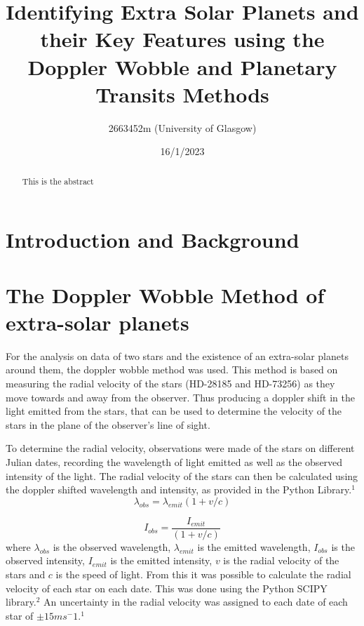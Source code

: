 \documentclass[]{article}
\title{\textbf{Identifying Extra Solar Planets and their Key Features using 
the Doppler Wobble and Planetary Transits Methods}}
\author{2663452m (University of Glasgow)}
\date{16/1/2023}
\begin{document}
\maketitle

\begin{abstract}
This is the abstract

\end{abstract}
\newpage



\twocolumn
\section*{Introduction and Background}

\section*{The Doppler Wobble Method of extra-solar planets}
\par
For the analysis on data of two stars and the existence of an extra-solar planets 
around them, the doppler wobble method was used. This method is based on measuring the 
radial velocity of the stars (HD-28185 and HD-73256) as they move towards and away from 
the observer. Thus
producing a doppler shift in the light emitted from the stars, that can be used to 
determine the velocity of the stars in the plane of the observer's line of sight. 
\par
To determine the radial velocity, observations were made of the stars on different
Julian dates, recording the wavelength of light emitted as well as the observed intensity 
of the light. The radial velocity of the stars can then be calculated using the doppler
shifted wavelength and intensity, as provided in the Python Library.$^1$ 
\begin{equation}\label{eq:wavelength doppler}\lambda_{obs} = \lambda_{emit}{(1+v/c)}
\end{equation}

\begin{equation}\label{eq:intensity doppler}I_{obs} = \frac{I_{emit}}{(1+v/c)}
\end{equation}
where $\lambda_{obs}$ is the observed wavelength, $\lambda_{emit}$ is the 
emitted wavelength, $I_{obs}$ is the observed intensity, $I_{emit}$ is the emitted 
intensity, $v$ is the radial velocity of the stars and $c$ is the speed of light.
From this it was possible to calculate the radial velocity of each star on each date.
This was done using the Python SCIPY library.$^2$ An uncertainty in the radial velocity
was assigned to each date of each star of $\pm 15 ms^-1$.$^1$
\par
\end{document}
